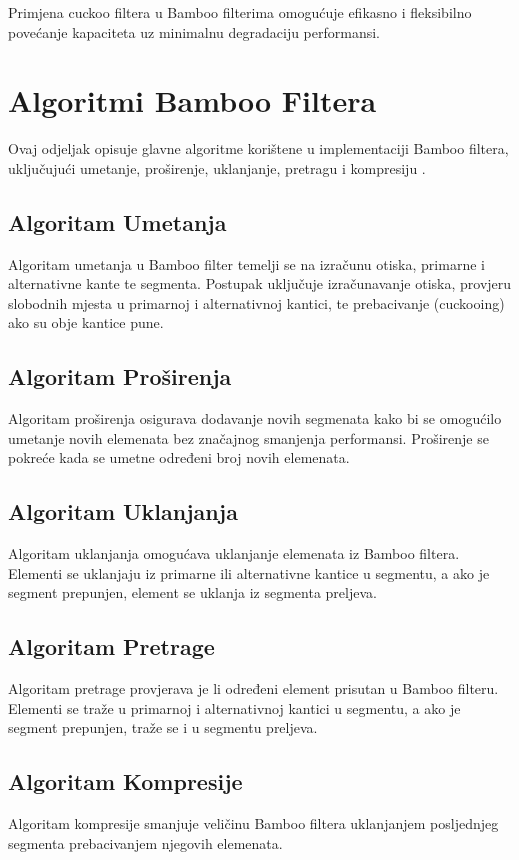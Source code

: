 \documentclass[seminarskirad]{fer}
\begin{document}
	Primjena cuckoo filtera u Bamboo filterima omogućuje efikasno i fleksibilno povećanje kapaciteta uz minimalnu degradaciju performansi.
	
	
	\section{Algoritmi Bamboo Filtera}
	Ovaj odjeljak opisuje glavne algoritme korištene u implementaciji Bamboo filtera, uključujući umetanje, proširenje, uklanjanje, pretragu i kompresiju \cite{wang2022bamboo}.
	
	\subsection{Algoritam Umetanja}
	Algoritam umetanja u Bamboo filter temelji se na izračunu otiska, primarne i alternativne kante te segmenta. Postupak uključuje izračunavanje otiska, provjeru slobodnih mjesta u primarnoj i alternativnoj kantici, te prebacivanje (cuckooing) ako su obje kantice pune.
	
	\subsection{Algoritam Proširenja}
	Algoritam proširenja osigurava dodavanje novih segmenata kako bi se omogućilo umetanje novih elemenata bez značajnog smanjenja performansi. Proširenje se pokreće kada se umetne određeni broj novih elemenata.
	
	\subsection{Algoritam Uklanjanja}
	Algoritam uklanjanja omogućava uklanjanje elemenata iz Bamboo filtera. Elementi se uklanjaju iz primarne ili alternativne kantice u segmentu, a ako je segment prepunjen, element se uklanja iz segmenta preljeva.
	
	\subsection{Algoritam Pretrage}
	Algoritam pretrage provjerava je li određeni element prisutan u Bamboo filteru. Elementi se traže u primarnoj i alternativnoj kantici u segmentu, a ako je segment prepunjen, traže se i u segmentu preljeva.
	
	\subsection{Algoritam Kompresije}
	Algoritam kompresije smanjuje veličinu Bamboo filtera uklanjanjem posljednjeg segmenta prebacivanjem njegovih elemenata.
	
\end{document}
